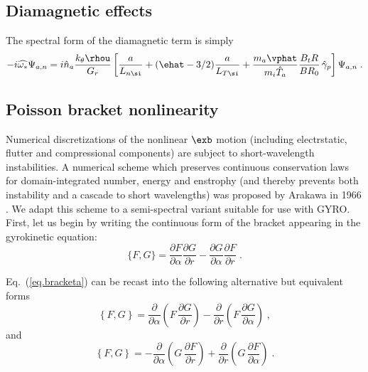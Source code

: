 \subsection{Diamagnetic effects}

The spectral form of the diamagnetic term is simply
%
\begin{equation}
-i \widehat{\omega_*} \Psi_{a,n}= i {\hat n}_a \frac{k_\theta \rhou}{G_r} 
 \left[ \frac{a}{L_{n\si}} + (\ehat-3/2) \frac{a}{L_{T\si}} 
 + \frac{m_a \vphat}{m_i \hat{T}_a} \frac{B_t R}{B R_0} \, 
 \hat{\gamma}_p \right] \Psi_{a,n} \; .
\end{equation} 

\subsection{Poisson bracket nonlinearity}
\label{sec.nonlinear}

Numerical discretizations of the nonlinear $\exb$ motion
(including electrstatic, flutter and compressional components) 
are subject to short-wavelength instabilities.  A numerical scheme 
which preserves continuous conservation laws for domain-integrated 
number, energy and enstrophy (and thereby prevents both instability 
and a cascade to short wavelengths) was proposed by Arakawa 
in 1966 \cite{arakawa:1966}.  We adapt this scheme to a semi-spectral 
variant suitable for use with GYRO.  First, let us begin by writing 
the continuous form of the bracket appearing in the gyrokinetic equation:
%
\begin{equation}
\{ F , G \} = 
\frac{\partial F}{\partial\alpha}
\frac{\partial G}{\partial r} 
-
\frac{\partial G}{\partial\alpha}
\frac{\partial F}{\partial r} \; .
\label{eq.bracketa}
\end{equation}

\noindent
Eq.~(\ref{eq.bracketa}) can be recast into the following alternative 
but equivalent forms
%
\begin{equation}
\left\{ F , G \right\} = 
\frac{\partial }{\partial\alpha} 
\left(F \, \frac{\partial G}{\partial r} \right) 
-
\frac{\partial}{\partial r} 
\left(F \, \frac{\partial G}{\partial\alpha} \right) \; ,
\label{eq.bracketb}
\end{equation}
\noindent 
and
%
\begin{equation}
\left\{ F , G \right\} = 
- \frac{\partial }{\partial\alpha} 
\left(G \, \frac{\partial F}{\partial r} \right) 
+
\frac{\partial}{\partial r} 
\left(G \, \frac{\partial F}{\partial\alpha} \right) \; .
\label{eq.bracketc}
\end{equation}

